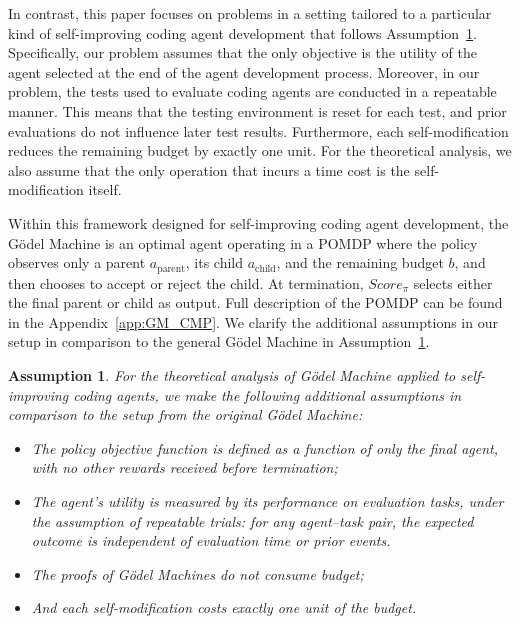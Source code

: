 \documentclass{article} %
\newtheorem{assumption}{Assumption}
\begin{document}
In contrast, this paper focuses on problems in a setting tailored to a particular kind of self-improving coding agent development that follows Assumption~\ref{assumption:main}. 
Specifically, our problem assumes that the only objective is the utility of the agent selected at the end of the agent development process.
Moreover, in our problem, the tests used to evaluate coding agents are conducted in a repeatable manner. This means that the testing environment is reset for each test, and prior evaluations do not influence later test results. Furthermore, each self-modification reduces the remaining budget by exactly one unit. For the theoretical analysis, we also assume that the only operation that incurs a time cost is the self-modification itself.

Within this framework designed for self-improving coding agent development, the G\"odel Machine is an optimal agent operating in a POMDP where the policy observes only a parent $a_\text{parent}$, its child $a_\text{child}$, and the remaining budget $b$, and then chooses to accept or reject the child. At termination, $Score_\pi$  selects either the final parent or child as output. Full description of the POMDP can be found in the Appendix~\ref{app:GM_CMP}. We clarify the additional assumptions in our setup in comparison to the general G\"odel Machine in Assumption~\ref{assumption:main}.



\begin{assumption}\label{assumption:main}
For the theoretical analysis of G\"odel Machine applied to self-improving coding agents, we make the following additional assumptions in comparison to the setup from the original G\"odel Machine:
\begin{itemize}
    \item The policy objective function is defined as a function of only the final agent, with no other rewards received before termination;
    \item The agent’s utility is measured by its performance on evaluation tasks, under the assumption of repeatable trials: for any agent–task pair, the expected outcome is independent of evaluation time or prior events.
    \item The proofs of G\"odel Machines do not consume budget;
    \item And each self-modification costs exactly one unit of the budget.
\end{itemize}
\end{assumption}
\end{document}

